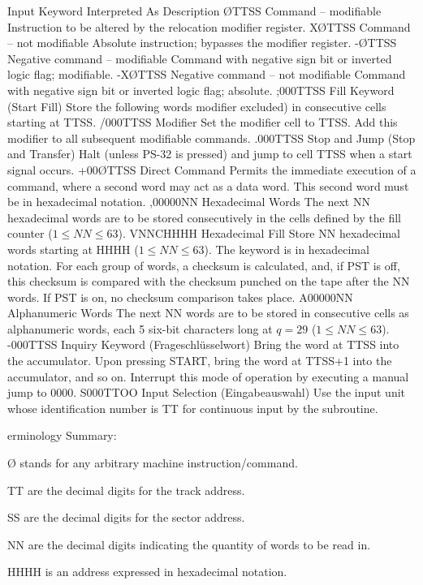 \documentclass{article}
\begin{document}
\begin{enumerate}
Input Keyword   Interpreted As	         Description
ØTTSS	        Command – modifiable     Instruction to be altered by the relocation modifier register.
XØTTSS	        Command – not modifiable Absolute instruction; bypasses the modifier register.
-ØTTSS	        Negative command – modifiable	Command with negative sign bit or inverted logic flag; modifiable.
-XØTTSS	        Negative command – not modifiable	Command with negative sign bit or inverted logic flag; absolute.
;000TTSS	    Fill Keyword (Start Fill)	     Store the following words modifier excluded) in consecutive cells starting at TTSS.
/000TTSS	   Modifier	                   Set the modifier cell to TTSS. Add this modifier to all subsequent modifiable commands.
.000TTSS	   Stop and Jump (Stop and Transfer)	Halt (unless PS-32 is pressed) and jump to cell TTSS when a start signal occurs.
+00ØTTSS	   Direct Command	           Permits the immediate execution of a command, where a second word may act as a data word. This second word must be in hexadecimal notation.
,00000NN      Hexadecimal Words             The next NN hexadecimal words are to be stored consecutively in the cells defined by the fill counter ($1 \le NN \le 63$).
VNNCHHHH      Hexadecimal Fill              Store NN hexadecimal words starting at HHHH ($1 \le NN \le 63$). The keyword is in hexadecimal notation. For each group of words, a checksum is calculated, and, if PST is off, this checksum is compared with the checksum punched on the tape after the NN words. If PST is on, no checksum comparison takes place.
A00000NN    Alphanumeric Words  The next NN words are to be stored in consecutive cells as alphanumeric words, each 5 six-bit characters long at $q=29$ ($1 \le NN \le 63$).
-000TTSS	Inquiry Keyword (Frageschlüsselwort)	Bring the word at TTSS into the accumulator. Upon pressing START, bring the word at TTSS+1 into the accumulator, and so on. Interrupt this mode of operation by executing a manual jump to 0000.
S000TTOO	Input Selection (Eingabeauswahl)	Use the input unit whose identification number is TT for continuous input by the subroutine.

erminology Summary:

Ø stands for any arbitrary machine instruction/command.

TT are the decimal digits for the track address.

SS are the decimal digits for the sector address.

NN are the decimal digits indicating the quantity of words to be read in.

HHHH is an address expressed in hexadecimal notation.




\end{enumerate}
\end{document}
